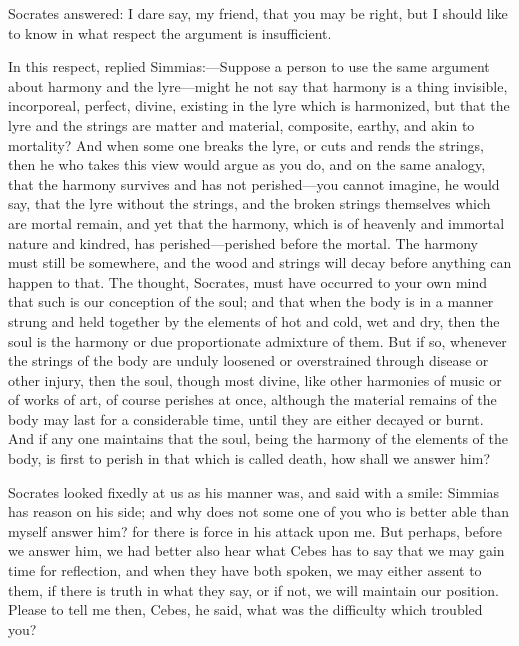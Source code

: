 Socrates answered: I dare say, my friend, that you may be right, but I
should like to know in what respect the argument is insufficient.

In this respect, replied Simmias:—Suppose a person to use the same
argument about harmony and the lyre—might he not say that harmony is
a thing invisible, incorporeal, perfect, divine, existing in the lyre
which is harmonized, but that the lyre and the strings are matter and
material, composite, earthy, and akin to mortality? And when some one
breaks the lyre, or cuts and rends the strings, then he who takes this
view would argue as you do, and on the same analogy, that the harmony
survives and has not perished—you cannot imagine, he would say, that
the lyre without the strings, and the broken strings themselves which are
mortal remain, and yet that the harmony, which is of heavenly and immortal
nature and kindred, has perished—perished before the mortal. The
harmony must still be somewhere, and the wood and strings will decay
before anything can happen to that. The thought, Socrates, must have
occurred to your own mind that such is our conception of the soul; and
that when the body is in a manner strung and held together by the elements
of hot and cold, wet and dry, then the soul is the harmony or due
proportionate admixture of them. But if so, whenever the strings of the
body are unduly loosened or overstrained through disease or other injury,
then the soul, though most divine, like other harmonies of music or of
works of art, of course perishes at once, although the material remains of
the body may last for a considerable time, until they are either decayed
or burnt. And if any one maintains that the soul, being the harmony of the
elements of the body, is first to perish in that which is called death,
how shall we answer him?

Socrates looked fixedly at us as his manner was, and said with a smile:
Simmias has reason on his side; and why does not some one of you who is
better able than myself answer him? for there is force in his attack upon
me. But perhaps, before we answer him, we had better also hear what Cebes
has to say that we may gain time for reflection, and when they have both
spoken, we may either assent to them, if there is truth in what they say,
or if not, we will maintain our position. Please to tell me then, Cebes,
he said, what was the difficulty which troubled you?

